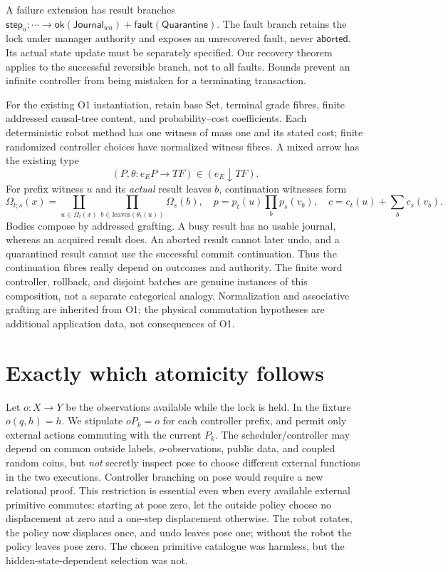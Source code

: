 \documentclass[11pt]{article}
\begin{document}
A failure extension has result branches
$\mathsf{step}_a:\cdots\to\mathsf{ok}(\mathsf{Journal}_{wa})+
\mathsf{fault}(\mathsf{Quarantine})$.
The fault branch retains the lock under manager authority and exposes an unrecovered fault, never $\mathsf{aborted}$. Its actual state update must be separately specified. Our recovery theorem applies to the successful reversible branch, not to all faults. Bounds prevent an infinite controller from being mistaken for a terminating transaction.

For the existing O1 instantiation, retain base Set, terminal grade fibres, finite addressed causal-tree content, and probability--cost coefficients. Each deterministic robot method has one witness of mass one and its stated cost; finite randomized controller choices have normalized witness fibres. A mixed arrow has the existing type
\[
 (P,\theta:e_EP\longrightarrow TF)\in(e_E\downarrow TF).
\]
For prefix witness $u$ and its \emph{actual} result leaves $b$, continuation witnesses form
\[
 \Omega_{t;s}(x)=\coprod_{u\in\Omega_t(x)}
       \prod_{b\in\mathrm{leaves}(\theta_t(u))}\Omega_s(b),
 \quad p=p_t(u)\prod_b p_s(v_b),\quad c=c_t(u)+\sum_b c_s(v_b).
\]
Bodies compose by addressed grafting. A busy result has no usable journal, whereas an acquired result does. An aborted result cannot later undo, and a quarantined result cannot use the successful commit continuation. Thus the continuation fibres really depend on outcomes and authority. The finite word controller, rollback, and disjoint batches are genuine instances of this composition, not a separate categorical analogy. Normalization and associative grafting are inherited from O1; the physical commutation hypotheses are additional application data, not consequences of O1.

\section{Exactly which atomicity follows}
Let $o:X\to Y$ be the observations available while the lock is held. In the fixture $o(q,h)=h$. We stipulate $oP_k=o$ for each controller prefix, and permit only external actions commuting with the current $P_k$. The scheduler/controller may depend on common outside labels, $o$-observations, public data, and coupled random coins, but \emph{not} secretly inspect pose to choose different external functions in the two executions. Controller branching on pose would require a new relational proof. This restriction is essential even when every available external primitive commutes: starting at pose zero, let the outside policy choose no displacement at zero and a one-step displacement otherwise. The robot rotates, the policy now displaces once, and undo leaves pose one; without the robot the policy leaves pose zero. The chosen primitive catalogue was harmless, but the hidden-state-dependent selection was not.
\end{document}
